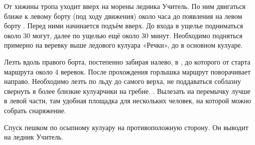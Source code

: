 От хижины \geoLighthouse{} тропа уходит вверх на морены ледника Учитель.
По ним двигаться ближе к левому борту (под ходу движения) около часа
до появления на левом борту . Перед ними начинается подъём вверх. До входа в ущелье
подниматься около 30 могут, далее по ущелью ещё около 30 минут.
Необходимо подняться примерно на веревку выше ледового кулуара
«Речки», до  в
основном кулуаре.

Лезть вдоль правого борта, постепенно забирая налево, в
, до
которого от старта маршрута около 4 веревок. После прохождения
горлышка маршрут поворачивает направо. Необходимо лезть по льду до
самого верха, не поддаваться соблазну свернуть в более близкие
кулуарчики на гребне. .
Вылезать на перемычку лучше в левой части, там удобная площадка для
нескольких человек, на которой можно собрать снаряжение.

Спуск пешком по осыпному кулуару на противоположную сторону. Он
выводит на ледник Учитель.
